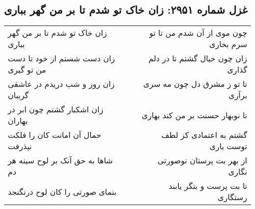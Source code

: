 \begin{center}
\section*{غزل شماره ۲۹۵۱: زان خاک تو شدم تا بر من گهر بباری}
\label{sec:2951}
\begin{longtable}{l p{0.5cm} r}
زان خاک تو شدم تا بر من گهر بباری
&&
چون موی از آن شدم من تا تو سرم بخاری
\\
زان دست شستم از خود تا دست من تو گیری
&&
زان چون خیال گشتم تا در دلم گذاری
\\
زان روز و شب دریدم در عاشقی گریبان
&&
تا تو ز مشرق دل چون مه سری برآری
\\
زان اشکبار گشتم چون ابر در بهاران
&&
تا نوبهار حسنت بر من کند بهاری
\\
حمال آن امانت کان را فلکت نپذرفت
&&
گشتم به اعتمادی کز لطف توست یاری
\\
شاها به حق آنک بر لوح سینه هر دم
&&
از بهر بت پرستان نوصورتی نگاری
\\
بنمای صورتی را کان لوح درنگنجد
&&
تا بت پرست و بتگر یابند رستگاری
\\
\end{longtable}
\end{center}
